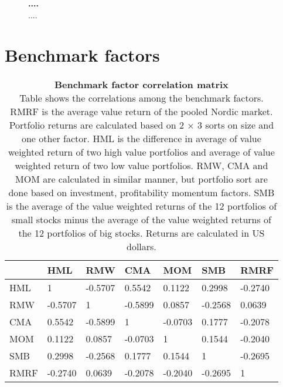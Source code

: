 \documentclass{article}
\begin{document}
\begin{figure}[ht]
\centering
\caption[...]{\textbf{....}\\ ....}

\label{plot:variableTS}
\end{figure}

\clearpage

\section{Benchmark factors}
\renewcommand{\thefigure}{B.\arabic{figure}}
\setcounter{figure}{0}
\renewcommand{\thetable}{B.\arabic{table}}
\setcounter{table}{0}

\begin{table}[h]
\small
\caption[Benchmark factor correlation matrix]{\textbf{Benchmark factor correlation matrix}\\ Table shows the correlations among the benchmark factors. RMRF is the average value return of the pooled Nordic market. Portfolio returns are calculated based on 2 × 3 sorts on size and one other factor. HML is the difference in average of value weighted return of two high value portfolios and average of value weighted return of two low value portfolios. RMW, CMA and MOM are calculated in similar manner, but portfolio sort are done based on investment, profitability momentum factors. SMB is the average of the value weighted returns of the 12 portfolios of small stocks minus the average of the value weighted returns of the 12 portfolios of big stocks. Returns are calculated in US dollars.}
\label{table:FFfactorsCorrelations}
\centering
{}
\begin{tabularx}{\textwidth}{@{\extracolsep{4pt}} X Y Y Y Y Y Y} 
\toprule
& HML & RMW & CMA & MOM & SMB & RMRF \\
\midrule
HML & 1 & -0.5707 & 0.5542 & 0.1122 & 0.2998 & -0.2740 \\
RMW & -0.5707 & 1 & -0.5899 & 0.0857 & -0.2568 & 0.0639 \\
CMA & 0.5542 & -0.5899 & 1 & -0.0703 & 0.1777 & -0.2078 \\
MOM & 0.1122 & 0.0857 & -0.0703 & 1 & 0.1544 & -0.2040 \\
SMB & 0.2998 & -0.2568 & 0.1777 & 0.1544 & 1 & -0.2695 \\
RMRF & -0.2740 & 0.0639 & -0.2078 & -0.2040 & -0.2695 & 1 \\
\bottomrule
\end{tabularx}
\end{table}
\end{document}
